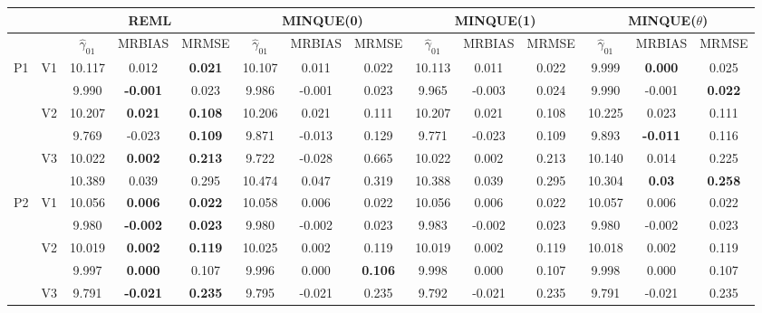 \documentclass[12pt,a4paper]{article}
\begin{document}
\begin{sidewaystable}[ht]
\centering
{\footnotesize
\begin{tabular}{cc|ccc|ccc|ccc|ccc|}
   & & \multicolumn{3}{c|}{REML}&\multicolumn{3}{c|}{MINQUE(0)}&\multicolumn{3}{c|}{MINQUE(1)}&\multicolumn{3}{c|}{MINQUE($\theta$)}\\ \hline
 &  & $\hat{\gamma}_{01}$ & MRBIAS & MRMSE & $\hat{\gamma}_{01}$ & MRBIAS & MRMSE & $\hat{\gamma}_{01}$ & MRBIAS & MRMSE & $\hat{\gamma}_{01}$ & MRBIAS & MRMSE \\ 
  \hline
\multirow{6}{*}{P1} & \multirow{2}{*}{V1} & 10.117 & 0.012 & \textbf{0.021} & 10.107 & 0.011 & 0.022 & 10.113 & 0.011 & 0.022 & 9.999 & \textbf{0.000} & 0.025 \\ 
   &  & 9.990 & \textbf{-0.001} & 0.023 & 9.986 & -0.001 & 0.023 & 9.965 & -0.003 & 0.024 & 9.990 & -0.001 & \textbf{0.022} \\ 
   & \multirow{2}{*}{V2} & 10.207 & \textbf{0.021} & \textbf{0.108} & 10.206 & 0.021 & 0.111 & 10.207 & 0.021 & 0.108 & 10.225 & 0.023 & 0.111 \\ 
   &  & 9.769 & -0.023 & \textbf{0.109} & 9.871 & -0.013 & 0.129 & 9.771 & -0.023 & 0.109 & 9.893 & \textbf{-0.011} & 0.116 \\ 
   & \multirow{2}{*}{V3} & 10.022 & \textbf{0.002} & \textbf{0.213} & 9.722 & -0.028 & 0.665 & 10.022 & 0.002 & 0.213 & 10.140 & 0.014 & 0.225 \\ 
   &  & 10.389 & 0.039 & 0.295 & 10.474 & 0.047 & 0.319 & 10.388 & 0.039 & 0.295 & 10.304 & \textbf{0.03} & \textbf{0.258} \\ 
   \hline \hline\multirow{6}{*}{P2} & \multirow{2}{*}{V1} & 10.056 & \textbf{0.006} & \textbf{0.022} & 10.058 & 0.006 & 0.022 & 10.056 & 0.006 & 0.022 & 10.057 & 0.006 & 0.022 \\ 
   &  & 9.980 & \textbf{-0.002} & \textbf{0.023} & 9.980 & -0.002 & 0.023 & 9.983 & -0.002 & 0.023 & 9.980 & -0.002 & 0.023 \\ 
   & \multirow{2}{*}{V2} & 10.019 & \textbf{0.002} & \textbf{0.119} & 10.025 & 0.002 & 0.119 & 10.019 & 0.002 & 0.119 & 10.018 & 0.002 & 0.119 \\ 
   &  & 9.997 & \textbf{0.000} & 0.107 & 9.996 & 0.000 & \textbf{0.106} & 9.998 & 0.000 & 0.107 & 9.998 & 0.000 & 0.107 \\ 
   & \multirow{2}{*}{V3} & 9.791 & \textbf{-0.021} & \textbf{0.235} & 9.795 & -0.021 & 0.235 & 9.792 & -0.021 & 0.235 & 9.791 & -0.021 & 0.235 \\ 

\end{tabular}}
\end{sidewaystable}
\end{document}
